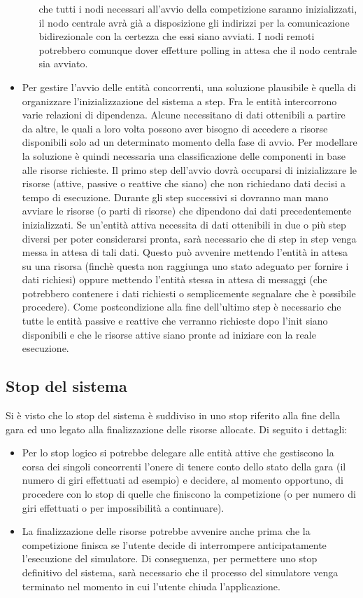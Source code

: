 \begin{itemize}
\begin{itemize}
che tutti i nodi necessari all'avvio della competizione saranno inizializzati,
il nodo centrale avrà già a disposizione gli indirizzi per la comunicazione
bidirezionale con la certezza che essi siano avviati. I nodi remoti potrebbero
comunque dover effetture polling in attesa che il nodo centrale sia avviato.
\end{itemize}
\item Per gestire l'avvio delle entità concorrenti, una soluzione plausibile è
quella di organizzare l'inizializzazione del sistema a step.
Fra le entità intercorrono varie relazioni di dipendenza. Alcune necessitano di
dati ottenibili a partire da altre, le quali a loro volta
possono aver bisogno di accedere a risorse disponibili solo ad un determinato
momento della fase di avvio. Per modellare la soluzione
è quindi necessaria una classificazione delle componenti in base alle risorse
richieste. Il primo step dell'avvio dovrà occuparsi di inizializzare
le risorse (attive, passive o reattive che siano) che non richiedano dati
decisi a tempo di esecuzione. Durante gli step successivi
si dovranno man mano avviare le risorse (o parti di risorse) che dipendono dai
dati precedentemente inizializzati. Se un'entità attiva necessita
di dati ottenibili in due o più step diversi per poter considerarsi pronta, sarà
necessario che di step in step venga messa in attesa di tali dati.
Questo può avvenire mettendo l'entità in attesa su una risorsa (finchè questa
non raggiunga uno stato adeguato per fornire i dati richiesi)
oppure mettendo l'entità stessa in attesa di messaggi (che potrebbero contenere
i dati richiesti o semplicemente segnalare che è possibile
procedere). Come postcondizione alla fine dell'ultimo step è necessario che
tutte le entità passive e reattive che verranno richieste dopo l'init
siano disponibili e che le risorse attive siano pronte ad iniziare con la reale
esecuzione.
\end{itemize}
\subsection{Stop del sistema}
Si è visto che lo stop del sistema è suddiviso in uno stop riferito alla fine
della gara ed uno legato alla finalizzazione delle risorse allocate.
Di seguito i dettagli:
\begin{itemize}
\item Per lo stop logico si potrebbe delegare alle entità attive che gestiscono
la corsa dei singoli concorrenti l'onere di tenere conto 
dello stato della gara (il numero di giri effettuati ad esempio) e decidere, al
momento opportuno, di procedere con lo stop di quelle che
finiscono la competizione (o per numero di giri effettuati o per impossibilità a
continuare).
\item La finalizzazione delle risorse potrebbe avvenire anche prima che la
competizione finisca se l'utente decide di interrompere anticipatamente
l'esecuzione del simulatore. Di conseguenza, per permettere uno stop definitivo
del sistema, sarà necessario che il processo del simulatore
venga terminato nel momento in cui l'utente chiuda l'applicazione.
\end{itemize}